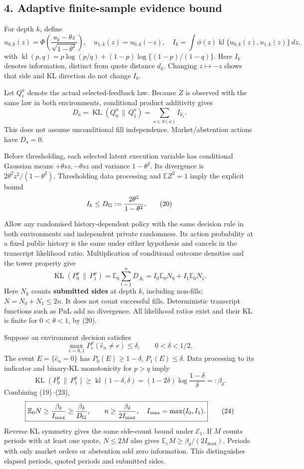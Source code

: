 \documentclass[
  10pt,
  a4paper,
]{article}
\begin{document}
\subsection{4. Adaptive finite-sample evidence
bound}\label{adaptive-finite-sample-evidence-bound}

For depth \(k\), define \[
u_{0,k}(z)=\Phi\!\left(\frac{a_k-\theta z}{\sqrt{1-\theta^2}}\right),\quad
u_{1,k}(z)=u_{0,k}(-z),\quad
I_k=\int\phi(z)\operatorname{kl}\{u_{0,k}(z),u_{1,k}(z)\}\,dz,
\tag{18}
\] with \(\operatorname{kl}(p,q)=p\log(p/q)+(1-p)\log\{(1-p)/(1-q)\}\).
Here \(I_k\) denotes information, distinct from quote distance \(d_k\).
Changing \(z\mapsto-z\) shows that side and KL direction do not change
\(I_k\).

Let \(Q_e^a\) denote the actual selected-feedback law. Because \(Z\) is
observed with the same law in both environments, conditional product
additivity gives \[
D_a=\operatorname{KL}(Q_0^a\,\|\,Q_1^a)
=\sum_{s\in S(a)}I_{k_s}.
\tag{19}
\] This does not assume unconditional fill independence.
Market/abstention actions have \(D_a=0\).

Before thresholding, each selected latent execution variable has
conditional Gaussian means \(+\theta sz,-\theta sz\) and variance
\(1-\theta^2\). Its divergence is \(2\theta^2z^2/(1-\theta^2)\).
Thresholding data processing and \(\mathbb E Z^2=1\) imply the explicit
bound \[
I_k\le D_{\rm G}:=\frac{2\theta^2}{1-\theta^2}.
\tag{20}
\]

Allow any randomised history-dependent policy with the same decision
rule in both environments and independent private randomness. Its action
probability at a fixed public history is the same under either
hypothesis and cancels in the transcript likelihood ratio.
Multiplication of conditional outcome densities and the tower property
give \[
\operatorname{KL}(P_0^\pi\,\|\,P_1^\pi)
=\mathbb E_0\sum_{t=1}^nD_{A_t}
=I_0\mathbb E_0N_0+I_1\mathbb E_0N_1.
\tag{21}
\] Here \(N_k\) counts \textbf{submitted sides} at depth \(k\),
including non-fills; \(N=N_0+N_1\le2n\). It does not count successful
fills. Deterministic transcript functions such as PnL add no divergence.
All likelihood ratios exist and their KL is finite for \(0<\theta<1\),
by (20).

Suppose an environment decision satisfies \[
\max_{e=0,1}P_e^\pi(\widehat e_n\ne e)\le\delta,\qquad 0<\delta<1/2.
\tag{22}
\] The event \(E=\{\widehat e_n=0\}\) has \(P_0(E)\ge1-\delta\),
\(P_1(E)\le\delta\). Data processing to its indicator and binary-KL
monotonicity for \(p>q\) imply \[
\operatorname{KL}(P_0^\pi\,\|\,P_1^\pi)
\ge\operatorname{kl}(1-\delta,\delta)
=(1-2\delta)\log\frac{1-\delta}{\delta}
=:\beta_\delta.
\tag{23}
\] Combining (19)--(23), \[
\boxed{
\mathbb E_0 N\ge\frac{\beta_\delta}{I_{\max}}
\ge\frac{\beta_\delta}{D_{\rm G}},\qquad
n\ge\frac{\beta_\delta}{2I_{\max}},\quad
I_{\max}=\max(I_0,I_1).
}
\tag{24}
\] Reverse KL symmetry gives the same side-count bound under
\(\mathcal E_1\). If \(M\) counts periods with at least one quote,
\(N\le2M\) also gives \(\mathbb E_eM\ge\beta_\delta/(2I_{\max})\).
Periods with only market orders or abstention add zero information. This
distinguishes elapsed periods, quoted periods and submitted sides.
\end{document}
